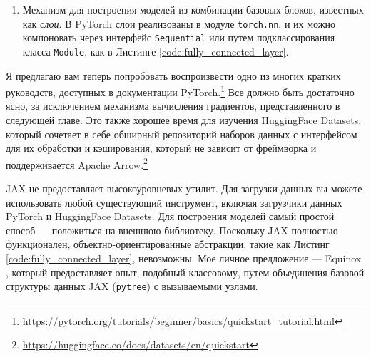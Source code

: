 \begin{enumerate}\addtocounter{enumi}{1}
\item Механизм для построения моделей из комбинации базовых блоков, известных как \textit{слои}. В PyTorch слои реализованы в модуле \texttt{torch.nn}, и их можно компоновать через интерфейс \texttt{Sequential} или путем подклассирования класса \texttt{Module}, как в Листинге \ref{code:fully_connected_layer}.
\end{enumerate}

Я предлагаю вам теперь попробовать воспроизвести одно из многих кратких руководств, доступных в документации PyTorch.\footnote{\url{https://pytorch.org/tutorials/beginner/basics/quickstart_tutorial.html}} Все должно быть достаточно ясно, за исключением механизма вычисления градиентов, представленного в следующей главе. Это также хорошее время для изучения HuggingFace Datasets, который сочетает в себе обширный репозиторий наборов данных с интерфейсом для их обработки и кэширования, который не зависит от фреймворка и поддерживается Apache Arrow.\footnote{\url{https://huggingface.co/docs/datasets/en/quickstart}}

JAX не предоставляет высокоуровневых утилит. Для загрузки данных вы можете использовать любой существующий инструмент, включая загрузчики данных PyTorch и HuggingFace Datasets. Для построения моделей самый простой способ — положиться на внешнюю библиотеку. Поскольку JAX полностью функционален, объектно-ориентированные абстракции, такие как Листинг \ref{code:fully_connected_layer}, невозможны. Мое личное предложение — Equinox \cite{kidger2021equinox}, который предоставляет опыт, подобный классовому, путем объединения базовой структуры данных JAX (\texttt{pytree}) с вызываемыми узлами.
